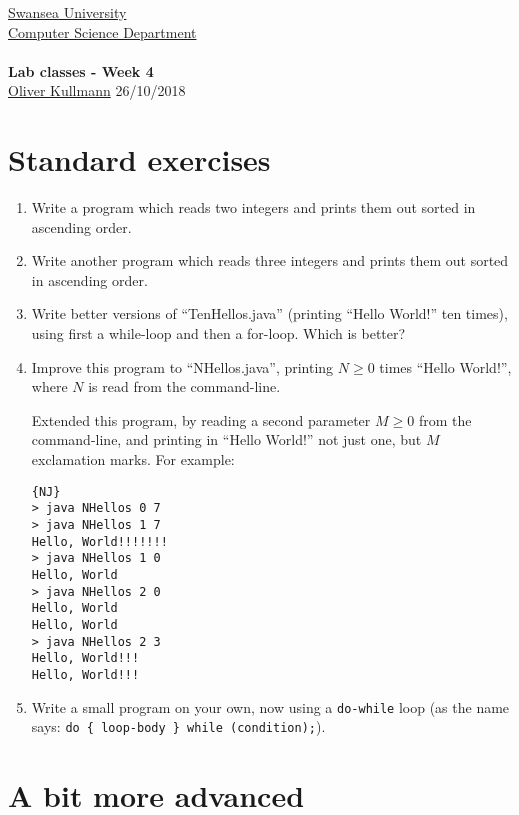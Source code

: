 \documentclass[11pt]{article}
\newcommand{\Java}{\lstset{language=Java,keywordstyle=\bfseries,breaklines,breakindent=30pt}}
\begin{document}
\begin{center}
  \href{http://www.swan.ac.uk/}{Swansea University}\\
  \href{http://www.swan.ac.uk/compsci/}{Computer Science Department}\\[1ex]
  \href{\chp}{\module}\\[1ex]
  \textbf{Lab classes - Week 4}\\
  \href{http://cs.swan.ac.uk/~csoliver}{Oliver Kullmann} 26/10/2018
\end{center}


\section{Standard exercises}
\label{sec:stdex}

\Java

\begin{enumerate}
\item Write a program which reads two integers and prints them out sorted in ascending order.
\item Write another program which reads three integers and prints them out sorted in ascending order.
\item Write better versions of ``TenHellos.java'' (printing ``Hello World!'' ten times), using first a while-loop and then a for-loop. Which is better?
\item Improve this program to ``NHellos.java'', printing $N \ge 0$ times ``Hello World!'', where $N$ is read from the command-line.

  Extended this program, by reading a second parameter $M \ge 0$ from the command-line, and printing in ``Hello World!'' not just one, but $M$ exclamation marks. For example:
  \begin{lstlisting}{NJ}
> java NHellos 0 7
> java NHellos 1 7
Hello, World!!!!!!!
> java NHellos 1 0
Hello, World
> java NHellos 2 0
Hello, World
Hello, World
> java NHellos 2 3
Hello, World!!!
Hello, World!!!
  \end{lstlisting}
\item Write a small program on your own, now using a \texttt{do-while} loop (as the name says: \texttt{do \{ loop-body \} while (condition);}).
\end{enumerate}


\section{A bit more advanced}
\label{sec:advanced}
\end{document}
